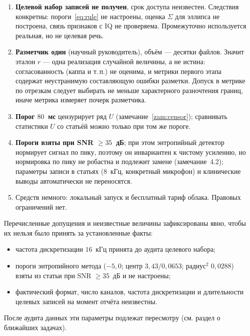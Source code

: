 \documentclass[11pt,a4paper]{article}
\theoremstyle{definition}
\theoremstyle{plain}
\begin{document}
\begin{enumerate}[leftmargin=1.6em]
  \item \textbf{Целевой набор записей не получен}, срок доступа неизвестен.
        Следствия конкретны: пороги~\eqref{eq:rule} не настроены, оценка
        $\Sigma$ для эллипса не построена, связь признаков с IQ не проверяема.
        Промежуточно используется реальная, но не целевая речь.
  \item \textbf{Разметчик один} (научный руководитель), объём --- десятки
        файлов. Значит эталон $r$ --- одна реализация случайной величины, а не
        истина: согласованность (каппа и т.\,п.) не оценима, и метрики первого
        этапа содержат неустранимую составляющую ошибки разметки. Допуск в
        метрике по отрезкам следует выбирать не меньше характерного разночтения
        границ, иначе метрика измеряет почерк разметчика.
  \item \textbf{Порог $80$~мс} цензурирует ряд $U$ (замечание~\ref{zam:censor});
        сравнивать статистики $U$ со статьёй можно только при том же пороге.
  \item \textbf{Пороги взяты при SNR $\ge35$~дБ}; при этом энтропийный
        детектор нормирует сигнал по пику, поэтому он инвариантен к чистому
        усилению, но нормировка по пику не робастна и подлежит замене
        (замечание~4.2); параметры записи в статьях ($8$~кГц, конкретный
        микрофон) и клинические выводы автоматически не переносятся.
  \item Средств немного: локальный запуск и бесплатный тариф облака.
        Правовых ограничений нет.
\end{enumerate}

Перечисленные допущения и неизвестные величины зафиксированы явно, чтобы их
нельзя было принять за установленные факты:
\begin{itemize}[leftmargin=1.4em]
  \item частота дискретизации $16$~кГц принята до аудита целевого набора;
  \item пороги энтропийного метода ($-5{,}0$; центр $3{,}43/0{,}0653$;
        радиус$^2$ $0{,}0288$) взяты из статьи при SNR $\ge35$~дБ и не настроены;
  \item фактический формат, число каналов, частота дискретизации и длительности
        целевых записей на момент отчёта неизвестны.
\end{itemize}
После аудита данных эти параметры подлежат пересмотру (см. раздел о ближайших
задачах).

\end{document}

